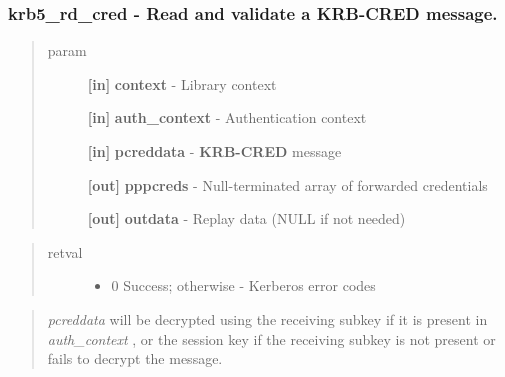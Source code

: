 \documentclass[letterpaper,10pt,english]{sphinxmanual}
\begin{document}
\subsubsection{krb5\_rd\_cred -  Read and validate a KRB-CRED message.}
\label{appdev/refs/api/krb5_rd_cred:krb5-rd-cred-read-and-validate-a-krb-cred-message}\label{appdev/refs/api/krb5_rd_cred::doc}

\begin{fulllineitems}
\label{appdev/refs/api/krb5_rd_cred:krb5_rd_cred}
\end{fulllineitems}

\begin{quote}\begin{description}
\item[{param}] \leavevmode
\textbf{{[}in{]}} \textbf{context} - Library context

\textbf{{[}in{]}} \textbf{auth\_context} - Authentication context

\textbf{{[}in{]}} \textbf{pcreddata} - \textbf{KRB-CRED} message

\textbf{{[}out{]}} \textbf{pppcreds} - Null-terminated array of forwarded credentials

\textbf{{[}out{]}} \textbf{outdata} - Replay data (NULL if not needed)

\end{description}\end{quote}
\begin{quote}\begin{description}
\item[{retval}] \leavevmode\begin{itemize}
\item {} 
0   Success; otherwise - Kerberos error codes

\end{itemize}

\end{description}\end{quote}
\begin{quote}

\emph{pcreddata} will be decrypted using the receiving subkey if it is present in \emph{auth\_context} , or the session key if the receiving subkey is not present or fails to decrypt the message.
\end{quote}
\end{document}
